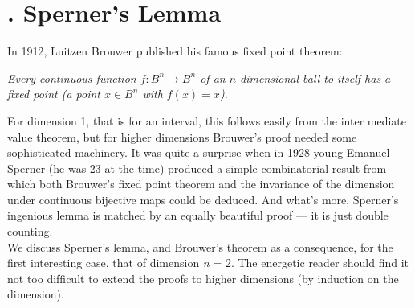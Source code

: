 \documentclass[10pt,twoside]{book}
\newcommand{\Font}[1]{\fontfamily{qhv}\selectfont #1}
\begin{document}
		\section*{\Font{6. Sperner's Lemma}}
		In 1912, Luitzen Brouwer published his famous fixed point theorem:
		\begin{center}\begin{minipage}{0.8\textwidth}\textit{Every continuous function $f: B^n \rightarrow B^n$ of an $n$-dimensional ball to itself has a fixed point (a point $x \in B^n$ with $f(x) = x$).}\end{minipage}\end{center}
		For dimension 1, that is for an interval, this follows easily from the inter mediate value theorem, but for higher dimensions Brouwer’s proof needed some sophisticated machinery. It was  quite a surprise when in 1928 young Emanuel Sperner (he was 23 at the time) produced a simple combinatorial result from which both Brouwer’s fixed point theorem and the invariance of the dimension under continuous bijective maps could be deduced. And what’s more, Sperner’s ingenious lemma is matched by an equally beautiful proof — it is just double counting.\\
		We discuss Sperner’s lemma, and Brouwer’s theorem as a consequence, for the ﬁrst interesting case, that of dimension \textit{n} = 2. The energetic reader should ﬁnd it not too difﬁcult to extend the proofs to higher dimensions (by induction on the dimension).\\
\end{document}
